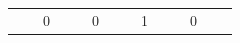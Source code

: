 \documentclass[12pt]{article}  %
\begin{document}
\begin{table}[H]
\begin{tabular}{cccccccccccccc}
\multicolumn{1}{l}{}                   &                                                                       & \cellcolor[HTML]{FD6864}0                                             &                                                                       &                                                                       & \cellcolor[HTML]{FD6864}0                                             &                                                                       &                                                                       & \cellcolor[HTML]{FD6864}1                                             &                                                                       &                                                                       & \cellcolor[HTML]{FD6864}0                                             & \multicolumn{1}{l}{}                                                  & \multicolumn{1}{l}{}     
\end{tabular}
\end{table}
\end{document}
